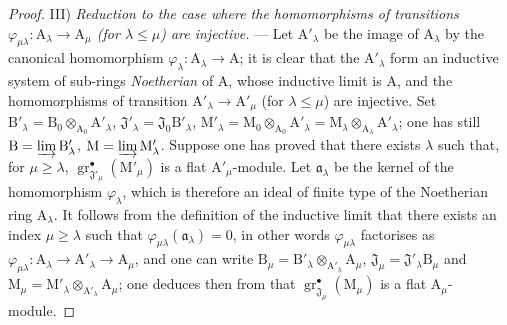 \begin{proof}
\medskip
\noindent III) \emph{Reduction to the case where the homomorphisms of transitions $\varphi_{\mu\lambda}:\mathrm{A}_\lambda\to\mathrm{A}_\mu$ (for $\lambda\leqslant\mu$) are injective.} --- Let $\mathrm{A}'_\lambda$ be the image of $\mathrm{A}_\lambda$ by the canonical homomorphism $\varphi_\lambda:\mathrm{A}_\lambda\to\mathrm{A}$; it is clear that the $\mathrm{A}'_\lambda$ form an inductive system of sub-rings \emph{Noetherian} of $\mathrm{A}$, whose inductive limit is $\mathrm{A}$, and the homomorphisms of transition $\mathrm{A}'_\lambda\to\mathrm{A}'_\mu$ (for $\lambda\leqslant\mu$) are injective. Set $\mathrm{B}'_\lambda=\mathrm{B}_0\otimes_{\mathrm{A}_0}\mathrm{A}'_\lambda$, $\mathfrak{J}'_\lambda=\mathfrak{J}_0\mathrm{B}'_\lambda$, $\mathrm{M}'_\lambda=\mathrm{M}_0\otimes_{\mathrm{A}_0}\mathrm{A}'_\lambda=\mathrm{M}_\lambda\otimes_{\mathrm{A}_\lambda}\mathrm{A}'_\lambda$; one has still $\mathrm{B}=\varinjlim\mathrm{B}'_\lambda$, $\mathrm{M}=\varinjlim\mathrm{M}'_\lambda$. Suppose one has proved that there exists $\lambda$ such that, for $\mu\geqslant\lambda$, $\operatorname{gr}^\bullet_{\mathfrak{J}'_\mu}(\mathrm{M}'_\mu)$ is a flat $\mathrm{A}'_\mu$-module. Let $\mathfrak{a}_\lambda$ be the kernel of the homomorphism $\varphi_\lambda$, which is therefore an ideal of finite type of the Noetherian ring $\mathrm{A}_\lambda$. It follows from the definition of the inductive limit that there exists an index $\mu\geqslant\lambda$ such that $\varphi_{\mu\lambda}(\mathfrak{a}_\lambda)=0$, in other words $\varphi_{\mu\lambda}$ factorises as $\varphi_{\mu\lambda}:\mathrm{A}_\lambda\to\mathrm{A}'_\lambda\to\mathrm{A}_\mu$, and one can write $\mathrm{B}_\mu=\mathrm{B}'_\lambda\otimes_{\mathrm{A}'_\lambda}\mathrm{A}_\mu$, $\mathfrak{J}_\mu=\mathfrak{J}'_\lambda\mathrm{B}_\mu$ and $\mathrm{M}_\mu=\mathrm{M}'_\lambda\otimes_{\mathrm{A}'_\lambda}\mathrm{A}_\mu$; one deduces then from  that $\operatorname{gr}^\bullet_{\mathfrak{J}_\mu}(\mathrm{M}_\mu)$ is a flat $\mathrm{A}_\mu$-module.


\end{proof}
